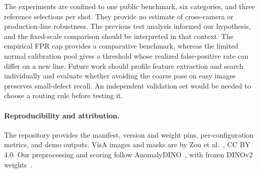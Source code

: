\documentclass[10pt,twocolumn,letterpaper]{article}
\begin{document}
The experiments are confined to one public benchmark, six categories, and three reference selections per shot. They provide no estimate of cross-camera or production-line robustness. The previous test analysis informed our hypothesis, and the fixed-scale comparison should be interpreted in that context. The empirical FPR cap provides a comparative benchmark, whereas the limited normal calibration pool gives a threshold whose realized false-positive rate can differ on a new line. Future work should profile feature extraction and search individually and evaluate whether avoiding the coarse pass on easy images preserves small-defect recall. An independent validation set would be needed to choose a routing rule before testing it.

\paragraph{Reproducibility and attribution.}
The repository provides the manifest, version and weight pins, per-configuration metrics, and demo outputs. VisA images and masks are by Zou et al.~\cite{zou2022visa}, CC BY 4.0. Our preprocessing and scoring follow AnomalyDINO~\cite{damm2025anomalydino}, with frozen DINOv2 weights~\cite{oquab2024dinov2}.

{\small


}
\end{document}

